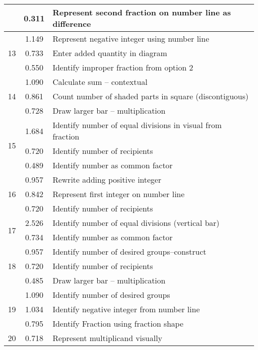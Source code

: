 \begin{longtable}[c]{|c|c|l|}
 & \small 0.311 & \small Represent second fraction on number line as difference \\
\hline
\multirow{3}{*}{\small 13} & \small 1.149 & \small Represent negative integer using number line \\
 & \small 0.733 & \small Enter added quantity in diagram \\
 & \small 0.550 & \small Identify improper fraction from option 2 \\
\hline
\multirow{3}{*}{\small 14} & \small 1.090 & \small Calculate sum -- contextual \\
 & \small 0.861 & \small Count number of shaded parts in square (discontiguous) \\
 & \small 0.728 & \small Draw larger bar -- multiplication \\
\hline
\multirow{3}{*}{\small 15} & \small 1.684 & \small Identify number of equal divisions in visual from fraction \\
 & \small 0.720 & \small Identify number of recipients \\
 & \small 0.489 & \small Identify number as common factor \\
\hline
\multirow{3}{*}{\small 16} & \small 0.957 & \small Rewrite adding positive integer \\
 & \small 0.842 & \small Represent first integer on number line \\
 & \small 0.720 & \small Identify number of recipients \\
\hline
\multirow{2}{*}{\small 17} & \small 2.526 & \small Identify number of equal divisions (vertical bar) \\
 & \small 0.734 & \small Identify number as common factor \\
\hline
\multirow{3}{*}{\small 18} & \small 0.957 & \small Identify number of desired groups--construct \\
 & \small 0.720 & \small Identify number of recipients \\
 & \small 0.485 & \small Draw larger bar -- multiplication \\
\hline
\multirow{3}{*}{\small 19} & \small 1.090 & \small Identify number of desired groups \\
 & \small 1.034 & \small Identify negative integer from number line \\
 & \small 0.795 & \small Identify Fraction using fraction shape \\
\hline
\multirow{3}{*}{\small 20} & \small 0.718 & \small Represent multiplicand visually \\

\end{longtable}
